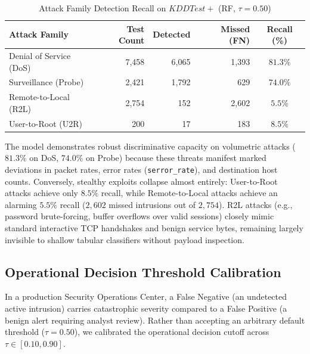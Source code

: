 \documentclass[conference]{IEEEtran}
\begin{document}
\begin{table}[h]
\caption{Attack Family Detection Recall on $KDDTest+$ (RF, $\tau=0.50$)}
\label{tab:threat_breakdown}
\centering
\begin{tabular}{lrrrc}
\toprule
\textbf{Attack Family} & \textbf{Test Count} & \textbf{Detected} & \textbf{Missed (FN)} & \textbf{Recall (\%)} \\
\midrule
Denial of Service (DoS) & 7,458 & 6,065 & 1,393 & $\mathbf{81.3\%}$ \\
Surveillance (Probe) & 2,421 & 1,792 & 629 & $\mathbf{74.0\%}$ \\
Remote-to-Local (R2L) & 2,754 & 152 & 2,602 & $\mathbf{5.5\%}$ \\
User-to-Root (U2R) & 200 & 17 & 183 & $\mathbf{8.5\%}$ \\
\bottomrule
\end{tabular}
\end{table}

The model demonstrates robust discriminative capacity on volumetric attacks ($81.3\%$ on DoS, $74.0\%$ on Probe) because these threats manifest marked deviations in packet rates, error rates (\texttt{serror\_rate}), and destination host counts. Conversely, stealthy exploits collapse almost entirely: User-to-Root attacks achieve only $8.5\%$ recall, while Remote-to-Local attacks achieve an alarming $5.5\%$ recall ($2,602$ missed intrusions out of $2,754$). R2L attacks (e.g., password brute-forcing, buffer overflows over valid sessions) closely mimic standard interactive TCP handshakes and benign service bytes, remaining largely invisible to shallow tabular classifiers without payload inspection.

\subsection{Operational Decision Threshold Calibration}

In a production Security Operations Center, a False Negative (an undetected active intrusion) carries catastrophic severity compared to a False Positive (a benign alert requiring analyst review). Rather than accepting an arbitrary default threshold ($\tau = 0.50$), we calibrated the operational decision cutoff across $\tau \in [0.10, 0.90]$.
\end{document}
